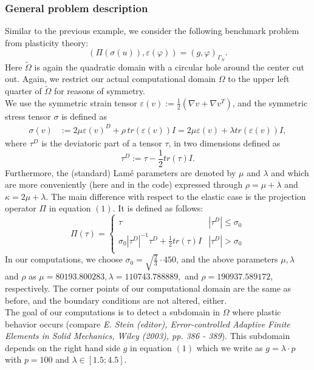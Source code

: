 \subsubsection{General problem description}

Similar to the previous example, we consider the following benchmark problem from plasticity theory:
\begin{equation}
   (\Pi(\sigma(u)),\varepsilon(\varphi)) = (g,\varphi)_{\Gamma_N}.
\end{equation}
Here $\tilde{\Omega}$ is again the quadratic domain with a circular hole around the center cut out. Again, we restrict our actual computational domain $\Omega$ to the upper left quarter of $\tilde{\Omega}$ for reasons of symmetry.\\
We use the symmetric strain tensor $\varepsilon(v) := \frac{1}{2}(\nabla v + \nabla v^T)$, and the symmetric stress tensor $\sigma$ is defined as
\begin{align*}
   \sigma(v) &:= 2\mu \varepsilon(v)^D + \rho \, tr (\varepsilon(v)) I = 2\mu\varepsilon(v) + \lambda tr(\varepsilon(v)) I,
\end{align*}
where $\tau^D$ is the deviatoric part of a tensor $\tau$, in two dimensions defined as
\begin{equation*}
   \tau^D := \tau - \frac{1}{2} tr(\tau) I.
\end{equation*}
Furthermore, the (standard) Lam\'e parameters are denoted by $\mu$ and
$\lambda$ and which are more conveniently (here and in the code) expressed through
$\rho = \mu + \lambda$ and $\kappa = 2\mu + \lambda$.
The main difference with respect to the elastic case is the projection operator $\Pi$ in equation $(1)$. It is defined as follows:
\begin{equation*}
\Pi(\tau) = \left\{
            \begin{array}{lr}
            \tau & |\tau^D| \leq \sigma_0\\
            \sigma_0 |\tau^D|^{-1} \tau^D + \frac{1}{2} tr(\tau) I & |\tau^D| > \sigma_0\\ 
            \end{array}
            \right. 
\end{equation*}
In our computations, we choose $\sigma_0 = \sqrt{\frac{2}{3}}\cdot 450$, and
the above parameters $\mu, \lambda$ and $\rho$ as $\mu = 80193.800283, \lambda
= 110743.788889, $ and $\rho = 190937.589172$, respectively. The corner points of our computational domain are the same as before, and the boundary conditions are not altered, either.\\
The goal of our computations is to detect a subdomain in $\Omega$ where plastic behavior occurs (compare \textit{E. Stein (editor), Error-controlled Adaptive Finite Elements in Solid Mechanics, Wiley (2003), pp. 386 - 389}). This subdomain depends on the right hand side $g$ in equation $(1)$ which we write as $g = \lambda \cdot p$ with $p = 100$ and $\lambda \in [1.5;4.5]$.\\

